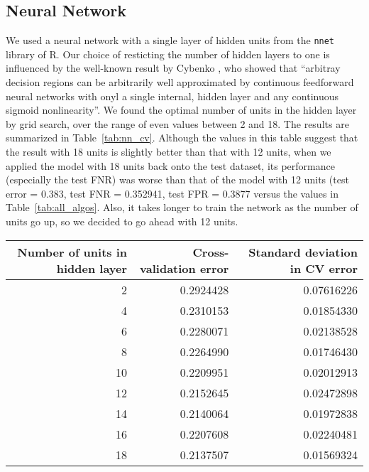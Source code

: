 \subsection{Neural Network}
\label{subsec:nnet}
We used a neural network with a single layer of hidden units from the \texttt{nnet} \cite{nnet} library of R. Our choice of resticting the number of hidden layers to one is influenced by the well-known result by Cybenko \cite{Cybenko92}, who showed that ``arbitray decision regions can be arbitrarily well approximated by continuous feedforward neural networks with onyl a single internal, hidden layer and any continuous sigmoid nonlinearity''. We found the optimal number of units in the hidden layer by grid search, over the range of even values between 2 and 18. The results are summarized in Table~\ref{tab:nn_cv}. Although the values in this table suggest that the result with 18 units is slightly better than that with 12 units, when we applied the model with 18 units back onto the test dataset, its performance (especially the test FNR) was worse than that of the model with 12 units (test error = 0.383, test FNR = 0.352941, test FPR = 0.3877 versus the values in Table~\ref{tab:all_algos}. Also, it takes longer to train the network as the number of units go up, so we decided to go ahead with 12 units.

\begin{table*}[!h]
\centering
\caption{Results of grid search for neural network}
\begin{tabular}{rrr}
\hline
Number of units in hidden layer & Cross-validation error & Standard deviation in CV error\\
\hline
2 & 0.2924428 & 0.07616226\\
4 & 0.2310153 & 0.01854330\\
6 & 0.2280071 & 0.02138528\\
8 & 0.2264990 & 0.01746430\\
10 & 0.2209951 & 0.02012913\\
12 & 0.2152645 & 0.02472898\\
14 & 0.2140064 & 0.01972838\\
16 & 0.2207608 & 0.02240481\\
18 & 0.2137507 & 0.01569324\\
\hline
\end{tabular}
\label{tab:nn_cv}
\end{table*}

